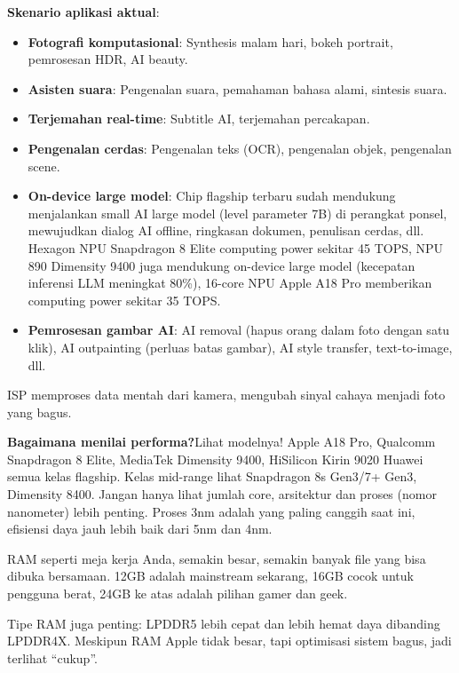 \textbf{Skenario aplikasi aktual}:

\begin{itemize}
  \item \textbf{Fotografi komputasional}: Synthesis malam hari, bokeh portrait, pemrosesan HDR, AI beauty.
  \item \textbf{Asisten suara}: Pengenalan suara, pemahaman bahasa alami, sintesis suara.
  \item \textbf{Terjemahan real-time}: Subtitle AI, terjemahan percakapan.
  \item \textbf{Pengenalan cerdas}: Pengenalan teks (OCR), pengenalan objek, pengenalan scene.
  \item \textbf{On-device large model}: Chip flagship terbaru sudah mendukung menjalankan small AI large model (level parameter 7B) di perangkat ponsel, mewujudkan dialog AI offline, ringkasan dokumen, penulisan cerdas, dll. Hexagon NPU Snapdragon 8 Elite computing power sekitar 45 TOPS, NPU 890 Dimensity 9400 juga mendukung on-device large model (kecepatan inferensi LLM meningkat 80\%), 16-core NPU Apple A18 Pro memberikan computing power sekitar 35 TOPS.
  \item \textbf{Pemrosesan gambar AI}: AI removal (hapus orang dalam foto dengan satu klik), AI outpainting (perluas batas gambar), AI style transfer, text-to-image, dll.
\end{itemize}


ISP memproses data mentah dari kamera, mengubah sinyal cahaya menjadi foto yang bagus.

\textbf{Bagaimana menilai performa?}Lihat modelnya! Apple A18 Pro, Qualcomm Snapdragon 8 Elite, MediaTek Dimensity 9400, HiSilicon Kirin 9020 Huawei semua kelas flagship. Kelas mid-range lihat Snapdragon 8s Gen3/7+ Gen3, Dimensity 8400. Jangan hanya lihat jumlah core, arsitektur dan proses (nomor nanometer) lebih penting. Proses 3nm adalah yang paling canggih saat ini, efisiensi daya jauh lebih baik dari 5nm dan 4nm.


RAM seperti meja kerja Anda, semakin besar, semakin banyak file yang bisa dibuka bersamaan. 12GB adalah mainstream sekarang, 16GB cocok untuk pengguna berat, 24GB ke atas adalah pilihan gamer dan geek.

Tipe RAM juga penting: LPDDR5 lebih cepat dan lebih hemat daya dibanding LPDDR4X. Meskipun RAM Apple tidak besar, tapi optimisasi sistem bagus, jadi terlihat “cukup”.

